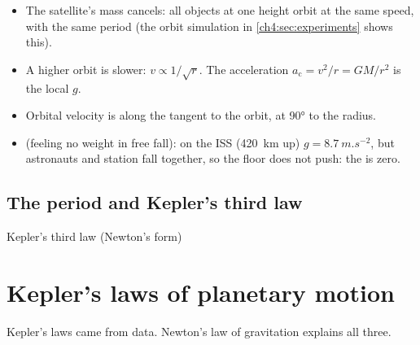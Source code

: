 \begin{itemize}
  \item The satellite's mass cancels: all objects at one height orbit at the same speed, with the
        same period (the orbit simulation in \cref{ch4:sec:experiments} shows this).
  \item A higher orbit is slower: $v \propto 1/\sqrt r$. The acceleration
        $a_\mathrm{c} = v^2/r = GM/r^2$ is the local $g$.
  \item Orbital velocity is along the tangent to the orbit, at \ang{90} to the radius.
  \item {} (feeling no weight in free fall): on the ISS (\qty{420}{km}
        up) $g = \qty{8.7}{m.s^{-2}}$, but astronauts and station fall together, so the floor does
        not push: the  is zero.
\end{itemize}

\subsection{The period and Kepler's third law}
\begin{formulacard}{Kepler's third law (Newton's form)}
  \begin{symbols}
  \end{symbols}
\end{formulacard}

\section{Kepler's laws of planetary motion}\label{ch4:sec:kepler}

\begin{bigidea}
Kepler's laws came from data. Newton's law of gravitation explains all three.
\end{bigidea}

